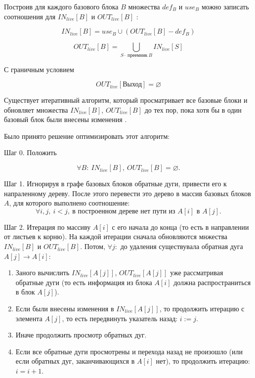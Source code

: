 \documentclass{article}
\begin{document}
Построив для каждого базового блока $B$ множества $def_B$ и $use_B$ можно записать соотношения для $IN_{live}[B]$ и $OUT_{live}[B]$ \cite[734]{dragonbook}:

\begin{equation*}
    IN_{live}[B] = use_B \cup  ( OUT_{live}[B] - def_B )
\end{equation*}

\begin{equation*}
    OUT_{live}[B] = \bigcup_{S\text{-- преемник}\ B} IN_{live}[S]
\end{equation*}

С граничным условием

\begin{equation*}
    OUT_{live}[\text{Выход}] = \varnothing
\end{equation*}


Существует итеративный алгоритм, который просматривает все базовые блоки и обновляет множества $IN_{live}[B]$,
$OUT_{live}[B]$ до тех пор, пока хотя бы в один базовый блок были внесены изменения \cite[735]{dragonbook}.


Было принято решение оптимизировать этот алгоритм:


Шаг 0. Положить 

\begin{equation*}
    \forall B:\ IN_{live}[B],\ OUT_{live}[B] = \varnothing.
\end{equation*}


Шаг 1. Игнорируя в графе базовых блоков обратные дуги, привести его к напраленному дереву. 
После этого перевести это дерево в массив базовых блоков $A$,
для которого выполнено соотношение: 
\begin{equation*}
    \forall i, j,\  i < j,\ \text{в построенном дереве нет пути из } A[i] \text{ в } A[j].
\end{equation*}

Шаг 2. Итерация по массиву $A[i]$ с его начала до конца (то есть в направлении от листьев к корню).
На каждой итерации сначала обновляются мнжества $IN_{live}[B]$ и $OUT_{live}[B]$.
Потом, $\forall j :$ до удаления существувала обратная дуга $A[j] \rightarrow A[i]$:

\begin{enumerate}
    
    \item Заного вычислить $IN_{live}[A[j]]$, $OUT_{live}[A[j]]$ уже рассматривая обратные дуги (то есть информация из блока $A[i]$ должна распространиться в блок $A[j]$).
    
    \item Если были внесены изменения в $IN_{live}[A[j]]$, то продолжить итерацию с элемента $A[j]$, то есть передвинуть указатель назад: $i := j$.

    \item Иначе продолжить просмотр обратных дуг.
    
    \item Если все обратные дуги просмотрены и перехода назад не произошло (или если обратных дуг, заканчивающихся в $A[i]$ нет), то продолжить итерацию: $i = i + 1$.

\end{enumerate}
\end{document}
